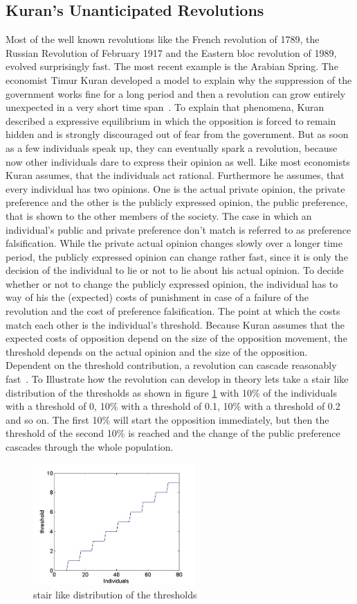 

\subsection{Kuran's Unanticipated Revolutions} 
\label{sec:Kuran}

Most of the well known revolutions like the French revolution of 1789, the Russian Revolution of February 1917 and the Eastern bloc revolution of 1989, evolved surprisingly fast. The most recent example is the Arabian Spring. The economist Timur Kuran developed a model to explain why the suppression of the government works fine for a long period and then a revolution can grow entirely unexpected in a very short time span~\cite{Kuran_1989}.
To explain that phenomena, Kuran described a expressive equilibrium in which the opposition is forced to remain hidden and is strongly discouraged out of fear from the government. But as soon as a few individuals speak up, they can eventually spark a revolution, because now other individuals dare to express their opinion as well.
Like most economists Kuran assumes, that the individuals act rational. Furthermore he assumes, that every individual has two opinions. One is the actual private opinion, the private preference and the other is the publicly expressed opinion, the public preference, that is shown to the other members of the society. The case in which an individual's public and private preference don't match is referred to as preference falsification. While the private actual opinion changes slowly over a longer time period, the publicly expressed opinion can change rather fast, since it is only the decision of the individual to lie or not to lie about his actual opinion. 
To decide whether or not to change the publicly expressed opinion, the individual has to way of his the (expected) costs of punishment in case of a failure of the revolution and the cost of preference falsification. The point at which the costs match each other is the individual's threshold.  Because Kuran assumes that the expected costs of opposition depend on the size of the opposition movement, the threshold depends on the actual opinion and the size of the opposition. Dependent on the threshold contribution, a revolution can cascade reasonably fast~\cite{Donnay_2011}.
To Illustrate how the revolution can develop in theory lets take a stair like distribution of the thresholds as shown in figure \ref{cascadethreshold} with 10\% of the individuals with a threshold of 0, 10\% with a threshold of 0.1, 10\% with a threshold of 0.2 and so on. The first 10\% will start the opposition immediately, but then the threshold of the second 10\% is reached and the change of the public preference cascades through the whole population.
\begin{figure}[!b]
\centering
\includegraphics[width=0.55\textwidth, keepaspectratio=true]{cascadethresholddistripution.jpg}
\caption{stair like distribution of the thresholds}
\label{cascadethreshold}
\end{figure}
